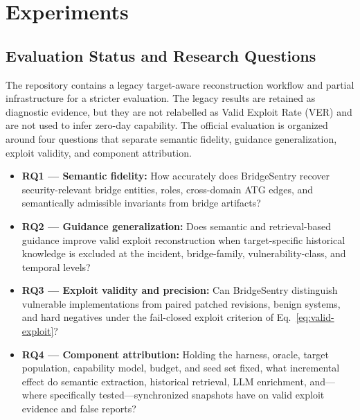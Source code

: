 
\section{Experiments}\label{sec:experiments}

\subsection{Evaluation Status and Research Questions}

The repository contains a legacy target-aware reconstruction workflow and partial infrastructure for a stricter evaluation. The legacy results are retained as diagnostic evidence, but they are not relabelled as Valid Exploit Rate (VER) and are not used to infer zero-day capability. The official evaluation is organized around four questions that separate semantic fidelity, guidance generalization, exploit validity, and component attribution.

\begin{itemize}
    \item \textbf{RQ1 --- Semantic fidelity:} How accurately does BridgeSentry recover security-relevant bridge entities, roles, cross-domain ATG edges, and semantically admissible invariants from bridge artifacts?

    \item \textbf{RQ2 --- Guidance generalization:} Does semantic and retrieval-based guidance improve valid exploit reconstruction when target-specific historical knowledge is excluded at the incident, bridge-family, vulnerability-class, and temporal levels?

    \item \textbf{RQ3 --- Exploit validity and precision:} Can BridgeSentry distinguish vulnerable implementations from paired patched revisions, benign systems, and hard negatives under the fail-closed exploit criterion of Eq.~\ref{eq:valid-exploit}?

    \item \textbf{RQ4 --- Component attribution:} Holding the harness, oracle, target population, capability model, budget, and seed set fixed, what incremental effect do semantic extraction, historical retrieval, LLM enrichment, and---where specifically tested---synchronized snapshots have on valid exploit evidence and false reports?
\end{itemize}

